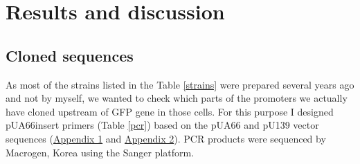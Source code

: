 \chapter{Results and discussion}

\shorthandoff{-} 

\section{Cloned  sequences}
As most of the strains listed in the Table \ref{strains} were prepared several years ago and not by myself, we wanted to check which parts of the promoters we actually have cloned upstream of GFP gene in those cells.
For this purpose I designed pUA66\textunderscore insert primers (Table \ref{pcr}) based on the pUA66 and pU139 vector sequences (\hyperlink{pUA66seq}{Appendix 1} and \hyperlink{pUA66seq}{Appendix 2}).
PCR products were sequenced by Macrogen, Korea using the Sanger platform.

